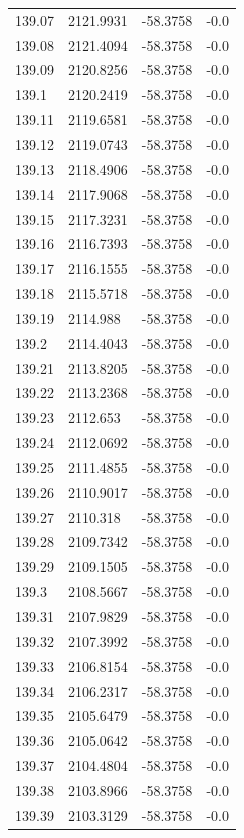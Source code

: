 \begin{table}[H]
\begin{tabular}{llll}
139.07 & 2121.9931 & -58.3758 & -0.0 \\
139.08 & 2121.4094 & -58.3758 & -0.0 \\
139.09 & 2120.8256 & -58.3758 & -0.0 \\
139.1 & 2120.2419 & -58.3758 & -0.0 \\
139.11 & 2119.6581 & -58.3758 & -0.0 \\
139.12 & 2119.0743 & -58.3758 & -0.0 \\
139.13 & 2118.4906 & -58.3758 & -0.0 \\
139.14 & 2117.9068 & -58.3758 & -0.0 \\
139.15 & 2117.3231 & -58.3758 & -0.0 \\
139.16 & 2116.7393 & -58.3758 & -0.0 \\
139.17 & 2116.1555 & -58.3758 & -0.0 \\
139.18 & 2115.5718 & -58.3758 & -0.0 \\
139.19 & 2114.988 & -58.3758 & -0.0 \\
139.2 & 2114.4043 & -58.3758 & -0.0 \\
139.21 & 2113.8205 & -58.3758 & -0.0 \\
139.22 & 2113.2368 & -58.3758 & -0.0 \\
139.23 & 2112.653 & -58.3758 & -0.0 \\
139.24 & 2112.0692 & -58.3758 & -0.0 \\
139.25 & 2111.4855 & -58.3758 & -0.0 \\
139.26 & 2110.9017 & -58.3758 & -0.0 \\
139.27 & 2110.318 & -58.3758 & -0.0 \\
139.28 & 2109.7342 & -58.3758 & -0.0 \\
139.29 & 2109.1505 & -58.3758 & -0.0 \\
139.3 & 2108.5667 & -58.3758 & -0.0 \\
139.31 & 2107.9829 & -58.3758 & -0.0 \\
139.32 & 2107.3992 & -58.3758 & -0.0 \\
139.33 & 2106.8154 & -58.3758 & -0.0 \\
139.34 & 2106.2317 & -58.3758 & -0.0 \\
139.35 & 2105.6479 & -58.3758 & -0.0 \\
139.36 & 2105.0642 & -58.3758 & -0.0 \\
139.37 & 2104.4804 & -58.3758 & -0.0 \\
139.38 & 2103.8966 & -58.3758 & -0.0 \\
139.39 & 2103.3129 & -58.3758 & -0.0 \\

\end{tabular}
\end{table}
